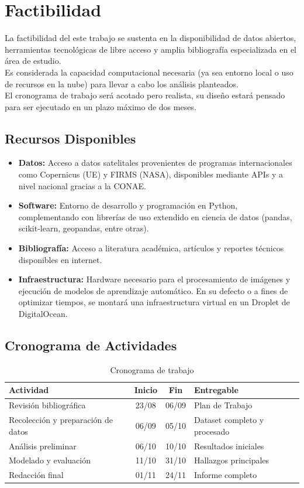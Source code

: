 \section{Factibilidad}
La factibilidad del este trabajo se sustenta en la disponibilidad de datos abiertos, herramientas tecnológicas de libre acceso y amplia bibliografía especializada en el área de estudio. \\ 

Es considerada la capacidad computacional necesaria (ya sea entorno local o uso de recursos en la nube) para llevar a cabo los análisis planteados. \\

El cronograma de trabajo será acotado pero realista, su diseño estará pensado para ser ejecutado en un plazo máximo de dos meses.

\subsection{Recursos Disponibles}
\begin{itemize}
    \item \textbf{Datos:} Acceso a datos satelitales provenientes de programas internacionales como Copernicus (UE) y FIRMS (NASA), disponibles mediante APIs y a nivel nacional gracias a la CONAE.
    \item \textbf{Software:} Entorno de desarrollo y programación en Python, complementando con librerías de uso extendido en ciencia de datos (pandas, scikit-learn, geopandas, entre otras).
    \item \textbf{Bibliografía:} Acceso a literatura académica, artículos y reportes técnicos disponibles en internet.
    \item \textbf{Infraestructura:} Hardware necesario para el procesamiento de imágenes y ejecución de modelos de aprendizaje automático. En su defecto o a fines de optimizar tiempos, se montará una infraestructura virtual en un Droplet de DigitalOcean.
\end{itemize}

\subsection{Cronograma de Actividades}
\begin{table}[h]
\centering
\begin{tabular}{lccl}
\toprule
\textbf{Actividad} & \textbf{Inicio} & \textbf{Fin} & \textbf{Entregable} \\
\midrule
Revisión bibliográfica & 23/08 & 06/09 & Plan de Trabajo \\
Recolección y preparación de datos & 06/09 & 05/10 & Dataset completo y procesado \\
Análisis preliminar & 06/10 & 10/10 & Resultados iniciales \\
Modelado y evaluación & 11/10 & 31/10 & Hallazgos principales \\
Redacción final & 01/11 & 24/11 & Informe completo \\
\bottomrule
\end{tabular}
\caption{Cronograma de trabajo}
\end{table}

